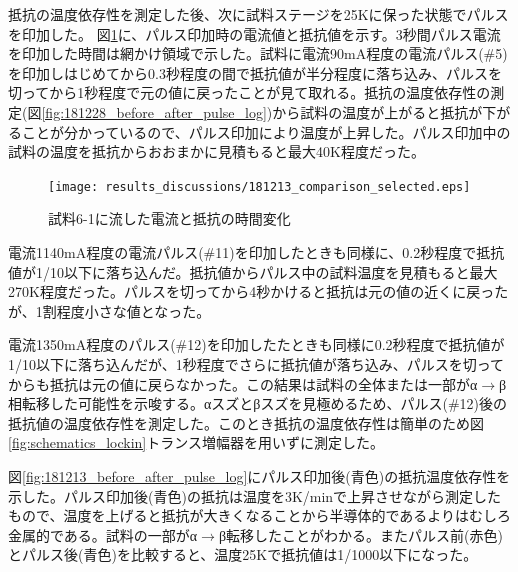 抵抗の温度依存性を測定した後、次に試料ステージを25Kに保った状態でパルスを印加した。
図\ref{fig:181213_comparison_selected}に、パルス印加時の電流値と抵抗値を示す。3秒間パルス電流を印加した時間は網かけ領域で示した。試料に電流90mA程度の電流パルス(\#5)を印加しはじめてから0.3秒程度の間で抵抗値が半分程度に落ち込み、パルスを切ってから1秒程度で元の値に戻ったことが見て取れる。抵抗の温度依存性の測定(図\ref{fig:181228_before_after_pulse_log})から試料の温度が上がると抵抗が下がることが分かっているので、パルス印加により温度が上昇した。パルス印加中の試料の温度を抵抗からおおまかに見積もると最大40K程度だった。
  \begin{figure}[!h]
    \begin{center}
   \texttt{[image: results\_discussions/181213\_comparison\_selected.eps]}
  \end{center}
  \caption{試料6-1に流した電流と抵抗の時間変化%
  }
  \label{fig:181213_comparison_selected}
  \end{figure}

電流1140mA程度の電流パルス(\#11)を印加したときも同様に、0.2秒程度で抵抗値が1/10以下に落ち込んだ。抵抗値からパルス中の試料温度を見積もると最大270K程度だった。パルスを切ってから4秒かけると抵抗は元の値の近くに戻ったが、1割程度小さな値となった。

電流1350mA程度のパルス(\#12)を印加したたときも同様に0.2秒程度で抵抗値が1/10以下に落ち込んだが、1秒程度でさらに抵抗値が落ち込み、パルスを切ってからも抵抗は元の値に戻らなかった。この結果は試料の全体または一部がα$\to$β相転移した可能性を示唆する。αスズとβスズを見極めるため、パルス(\#12)後の抵抗値の温度依存性を測定した。このとき抵抗の温度依存性は簡単のため図\ref{fig:schematics_lockin}トランス増幅器を用いずに測定した。

図\ref{fig:181213_before_after_pulse_log}にパルス印加後(青色)の抵抗温度依存性を示した。パルス印加後(青色)の抵抗は温度を3K/minで上昇させながら測定したもので、温度を上げると抵抗が大きくなることから半導体的であるよりはむしろ金属的である。試料の一部がα$\to$β転移したことがわかる。またパルス前(赤色)とパルス後(青色)を比較すると、温度25Kで抵抗値は1/1000以下になった。%

